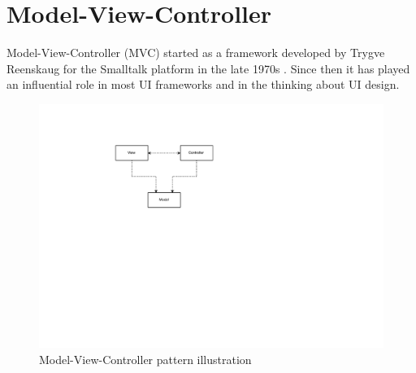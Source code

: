 \section{Model-View-Controller}
Model-View-Controller (MVC) started as a framework developed by Trygve Reenskaug for the Smalltalk platform in the late 1970s \cite{Fowler:2002:PEA:579257}. Since then it has played an influential role in most UI frameworks and in the thinking about UI design.

\begin{figure}[H]
\centering
\includegraphics[scale=0.8]{4-analysis/images/analysis-mvc.pdf}
\caption{Model-View-Controller pattern illustration \cite{Fowler:2002:PEA:579257}}
\label{fig:analysis-mvc}
\end{figure}

